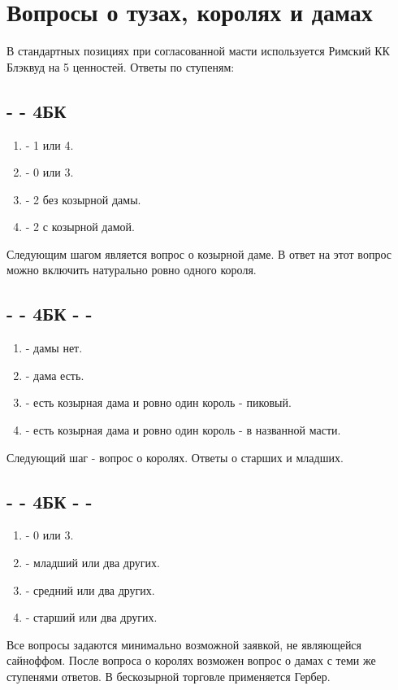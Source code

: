\documentclass{article}
\begin{document}
\section{Вопросы о тузах, королях и дамах}
В стандартных позициях при согласованной масти используется Римский КК Блэквуд на 5 ценностей. Ответы по ступеням:
\subsection{ -  - 4БК}
\begin{enumerate}
    \item[\cl{5}] - 1 или 4.
    \item[\di{5}] - 0 или 3.
    \item[\he{5}] - 2 без козырной дамы.
    \item[\sp{5}] - 2 с козырной дамой.
\end{enumerate}
Следующим шагом является вопрос о козырной даме. В ответ на этот вопрос можно включить натурально ровно одного короля.
\subsection{ -  - 4БК -  - }
\begin{enumerate}
    \item[\he{5}] - дамы нет.
    \item[\sp{5}] - дама есть.
    \item[5БК] - есть козырная дама и ровно один король - пиковый.
    \item[\cl{6}, \di{6}] - есть козырная дама и ровно один король - в названной масти.
\end{enumerate}
Следующий шаг - вопрос о королях. Ответы о старших и младших.
\subsection{ -  - 4БК -  - }
\begin{enumerate}
    \item[5БК] - 0 или 3.
    \item[\cl{6}] - младший или два других.
    \item[\di{6}] - средний или два других.
    \item[\he{6}] - старший или два других.
\end{enumerate}
Все вопросы задаются минимально возможной заявкой, не являющейся сайноффом. После вопроса о королях возможен вопрос о дамах с теми же ступенями ответов. В бескозырной торговле применяется Гербер.
\end{document}
